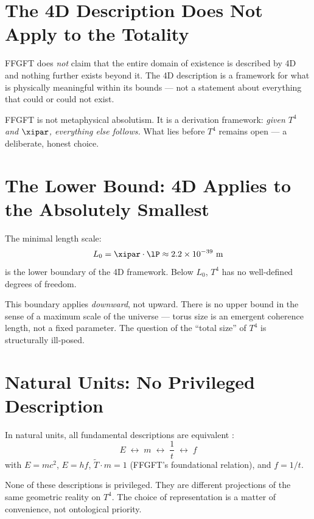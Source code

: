 \section{The 4D Description Does Not Apply to the Totality}

FFGFT does \emph{not} claim that the entire domain of existence is described by 4D and nothing further exists beyond it. The 4D description is a framework for what is physically meaningful within its bounds --- not a statement about everything that could or could not exist.

FFGFT is not metaphysical absolutism. It is a derivation framework: \emph{given $T^4$ and $\xipar$, everything else follows.} What lies before $T^4$ remains open --- a deliberate, honest choice.

\section{The Lower Bound: 4D Applies to the Absolutely Smallest}

The minimal length scale:
\begin{equation}
  L_0 = \xipar \cdot \lP \approx 2.2 \times 10^{-39} \text{ m}
\end{equation}
is the lower boundary of the 4D framework. Below $L_0$, $T^4$ has no well-defined degrees of freedom.

This boundary applies \emph{downward}, not upward. There is no upper bound in the sense of a maximum scale of the universe --- torus size is an emergent coherence length, not a fixed parameter. The question of the ``total size'' of $T^4$ is structurally ill-posed.

\section{Natural Units: No Privileged Description}

In natural units, all fundamental descriptions are equivalent \cite{Pascher2026}:
\begin{equation}
  E \;\longleftrightarrow\; m \;\longleftrightarrow\; \frac{1}{t} \;\longleftrightarrow\; f
\end{equation}
with $E = mc^2$, $E = hf$, $\tilde{T} \cdot m = 1$ (FFGFT's foundational relation), and $f = 1/t$.

None of these descriptions is privileged. They are different projections of the same geometric reality on $T^4$. The choice of representation is a matter of convenience, not ontological priority.

